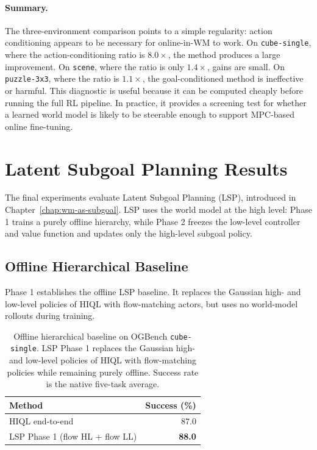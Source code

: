 \paragraph{Summary.}
The three-environment comparison points to a simple regularity:
action conditioning appears to be necessary for online-in-WM to work.
On \texttt{cube-single}, where the action-conditioning ratio is
$8.0\times$, the method produces a large improvement. On
\texttt{scene}, where the ratio is only $1.4\times$, gains are small.
On \texttt{puzzle-3x3}, where the ratio is $1.1\times$, the
goal-conditioned method is ineffective or harmful.
This diagnostic is useful because it can be computed cheaply before
running the full RL pipeline. In practice, it provides a screening test
for whether a learned world model is likely to be steerable enough to
support MPC-based online fine-tuning.

\section{Latent Subgoal Planning Results}
\label{sec:exp-wm-as-subgoal}

The final experiments evaluate Latent Subgoal Planning (LSP), introduced
in Chapter~\ref{chap:wm-as-subgoal}. LSP uses the world model at the
high level: Phase 1 trains a purely offline hierarchy, while Phase 2
freezes the low-level controller and value function and updates only
the high-level subgoal policy.

\subsection{Offline Hierarchical Baseline}
\label{sec:exp-lsp-phase1}

Phase 1 establishes the offline LSP baseline. It replaces the Gaussian
high- and low-level policies of HIQL with flow-matching actors, but uses
no world-model rollouts during training.

\begin{table}[h]
\centering
\caption{Offline hierarchical baseline on OGBench
\texttt{cube-single}. LSP Phase 1 replaces the Gaussian high- and
low-level policies of HIQL with flow-matching policies while remaining
purely offline. Success rate is the native five-task average.}
\label{tab:lsp-phase1}
\begin{tabular}{lr}
\toprule
Method & Success (\%) \\
\midrule
HIQL end-to-end & 87.0 \\
LSP Phase 1 (flow HL + flow LL) & \textbf{88.0} \\
\bottomrule
\end{tabular}
\end{table}

